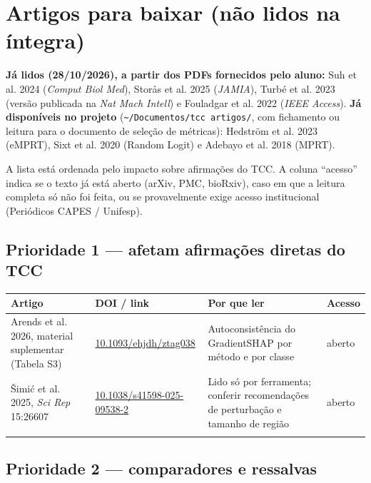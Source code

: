 \documentclass[11pt,a4paper]{article}
\begin{document}
\section{Artigos para baixar (não lidos na íntegra)}

\textbf{Já lidos (28/10/2026), a partir dos PDFs fornecidos pelo aluno:} Suh et al. 2024 (\textit{Comput Biol Med}), Storås et al. 2025 (\textit{JAMIA}), Turbé et al. 2023 (versão publicada na \textit{Nat Mach Intell}) e Fouladgar et al. 2022 (\textit{IEEE Access}). \textbf{Já disponíveis no projeto} (\texttt{\textasciitilde{}/Documentos/tcc artigos/}, com fichamento ou leitura para o documento de seleção de métricas): Hedström et al. 2023 (eMPRT), Sixt et al. 2020 (Random Logit) e Adebayo et al. 2018 (MPRT).

A lista está ordenada pelo impacto sobre afirmações do TCC. A coluna ``acesso'' indica se o texto já está aberto (arXiv, PMC, bioRxiv), caso em que a leitura completa só não foi feita, ou se provavelmente exige acesso institucional (Periódicos CAPES / Unifesp).

\subsection{Prioridade 1 — afetam afirmações diretas do TCC}

{\scriptsize\setlength{\tabcolsep}{3pt}
\begin{xltabular}{\linewidth}{>{\raggedright\arraybackslash}X>{\raggedright\arraybackslash}X>{\raggedright\arraybackslash}X>{\raggedright\arraybackslash}X}
\toprule
\textbf{Artigo} & \textbf{DOI / link} & \textbf{Por que ler} & \textbf{Acesso} \\
\midrule
\endhead
Arends et al. 2026, material suplementar (Tabela S3) & \href{https://academic.oup.com/ehjdh/article/7/3/ztag038/8512917}{10.1093/ehjdh/ztag038} & Autoconsistência do GradientSHAP por método e por classe & aberto \\ \addlinespace[1pt]
Šimić et al. 2025, \textit{Sci Rep} 15:26607 & \href{https://pmc.ncbi.nlm.nih.gov/articles/PMC12284047/}{10.1038/s41598-025-09538-2} & Lido só por ferramenta; conferir recomendações de perturbação e tamanho de região & aberto \\ \addlinespace[1pt]
\bottomrule
\end{xltabular}}


\subsection{Prioridade 2 — comparadores e ressalvas}
\end{document}
